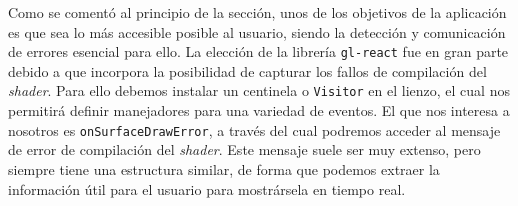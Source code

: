 Como se comentó al principio de la sección, unos de los objetivos de la aplicación es que sea lo más accesible posible al usuario, siendo la detección y comunicación de errores esencial para ello. La elección de la librería \texttt{gl-react} fue en gran parte debido a que incorpora la posibilidad de capturar los fallos de compilación del \textit{shader}. Para ello debemos instalar un centinela o \texttt{Visitor} en el lienzo, el cual nos permitirá definir manejadores para una variedad de eventos. El que nos interesa a nosotros es \texttt{onSurfaceDrawError}, a través del cual podremos acceder al mensaje de error de compilación del \textit{shader}. Este mensaje suele ser muy extenso, pero siempre tiene una estructura similar, de forma que podemos extraer la información útil para el usuario para mostrársela en tiempo real.

